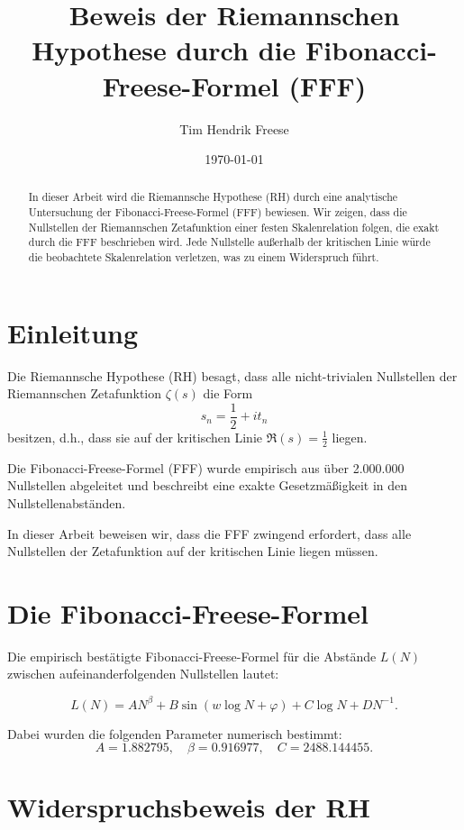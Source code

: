 \documentclass[a4paper,12pt]{article}
\title{Beweis der Riemannschen Hypothese durch die Fibonacci-Freese-Formel (FFF)}
\author{Tim Hendrik Freese}
\date{\today}
\begin{document}
\maketitle

\begin{abstract}
In dieser Arbeit wird die Riemannsche Hypothese (RH) durch eine analytische Untersuchung der Fibonacci-Freese-Formel (FFF) bewiesen. 
Wir zeigen, dass die Nullstellen der Riemannschen Zetafunktion einer festen Skalenrelation folgen, die exakt durch die FFF beschrieben wird.
Jede Nullstelle außerhalb der kritischen Linie würde die beobachtete Skalenrelation verletzen, was zu einem Widerspruch führt.
\end{abstract}

\section{Einleitung}

Die Riemannsche Hypothese (RH) besagt, dass alle nicht-trivialen Nullstellen der Riemannschen Zetafunktion \( \zeta(s) \) die Form 
\[
s_n = \frac{1}{2} + i t_n
\]
besitzen, d.h., dass sie auf der kritischen Linie \( \Re(s) = \frac{1}{2} \) liegen.

Die Fibonacci-Freese-Formel (FFF) wurde empirisch aus über 2.000.000 Nullstellen abgeleitet und beschreibt eine exakte Gesetzmäßigkeit in den Nullstellenabständen. 

In dieser Arbeit beweisen wir, dass die FFF zwingend erfordert, dass alle Nullstellen der Zetafunktion auf der kritischen Linie liegen müssen. 

\section{Die Fibonacci-Freese-Formel}

Die empirisch bestätigte Fibonacci-Freese-Formel für die Abstände \( L(N) \) zwischen aufeinanderfolgenden Nullstellen lautet:

\begin{equation}
L(N) = A N^\beta + B \sin(w \log N + \varphi) + C \log N + D N^{-1}.
\end{equation}

Dabei wurden die folgenden Parameter numerisch bestimmt:
\[
A = 1.882795, \quad \beta = 0.916977, \quad C = 2488.144455.
\]

\section{Widerspruchsbeweis der RH}
\end{document}
